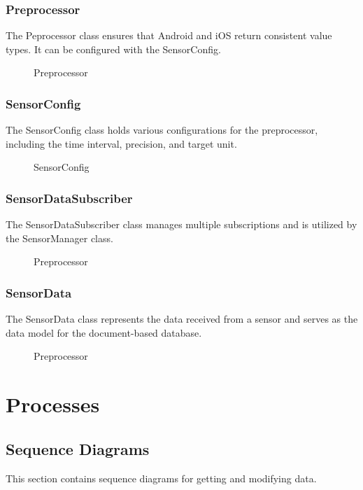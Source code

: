 \documentclass[12pt]{article}
\newcounter{fr}
\begin{document}
\subsubsection{Preprocessor}
The Peprocessor class ensures that Android and iOS return consistent value types. It can be configured with the SensorConfig.
\begin{figure}[ht]
\centering

\caption{\label{fig:bild13} Preprocessor}
\end{figure}

\subsubsection{SensorConfig}
The SensorConfig class holds various configurations for the preprocessor, including the time interval, precision, and target unit.
\begin{figure}[ht]
\centering

\caption{\label{fig:bild14} SensorConfig}
\end{figure}

\newpage
\subsubsection{SensorDataSubscriber}
The SensorDataSubscriber class manages multiple subscriptions and is utilized by the SensorManager class.
\begin{figure}[ht]
\centering

\caption{\label{fig:bild15} Preprocessor}
\end{figure}

\subsubsection{SensorData}
The SensorData class represents the data received from a sensor and serves as the data model for the document-based database.
\begin{figure}[ht]
\centering

\caption{\label{fig:bild16} Preprocessor}
\end{figure}

\newpage
\section{Processes}
\subsection{Sequence Diagrams}
This section contains sequence diagrams for getting and modifying data.
\end{document}

